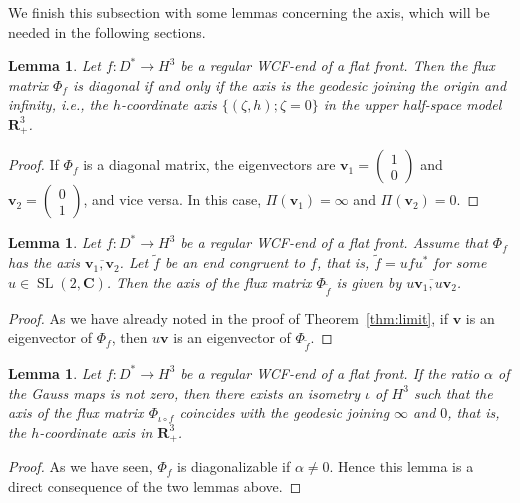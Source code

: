 \documentclass[a4paper]{amsart}
\theoremstyle{plain}
\newtheorem{lemma}[theorem]{Lemma}
\theoremstyle{remark}
\numberwithin{equation}{section}
\begin{document}
We finish this subsection with some lemmas concerning the axis, 
which will be needed in the following sections.
\begin{lemma}\label{lem:flux-diagonal}
 Let $f \colon D^*\to H^3$ be a regular WCF-end of a flat front.
Then the flux matrix
$\Phi_f$ is diagonal if and only if the axis is the geodesic joining 
 the origin and infinity, 
 i.e., the $h$-coordinate 
axis $\{(\zeta,h) ; \zeta=0 \}$ in the upper half-space 
model ${\boldsymbol{R}}^3_+$.
\end{lemma}
\begin{proof}
 If $\Phi_f$ is a diagonal matrix, the eigenvectors are 
 ${\boldsymbol{{v}}}_1=\begin{pmatrix}1\\0\end{pmatrix}$ and
 ${\boldsymbol{{v}}}_2=\begin{pmatrix}0\\1\end{pmatrix}$, 
 and vice versa. 
 In this case, 
 $\Pi({\boldsymbol{{v}}}_1)=\infty$ and $\Pi({\boldsymbol{{v}}}_2)=0$. 
\end{proof}
\begin{lemma}
 Let $f \colon D^*\to H^3$ be a regular WCF-end of a flat front.
 Assume that $\Phi_f$ has the axis $\overline{{\boldsymbol{{v}}}_1,{\boldsymbol{{v}}}_2}$. 
 Let $\tilde f$ be an end congruent to $f$, that is,  
 $\tilde f = ufu^{*}$ for some $u \in {\operatorname{SL}}(2, {\boldsymbol{C}})$.  
 Then the axis of the flux matrix $\Phi_{\tilde f}$ is given by 
 $\overline{u{\boldsymbol{{v}}}_1,u{\boldsymbol{{v}}}_2}$.
\end{lemma}
\begin{proof}
 As we have already noted in the proof of Theorem~\ref{thm:limit}, 
 if ${\boldsymbol{{v}}}$ is an eigenvector of $\Phi_f$, 
 then $u{\boldsymbol{{v}}}$ is an eigenvector of $\Phi_{\tilde f}$. 
\end{proof}

\begin{lemma}\label{lem:vertical-axis}
 Let $f\colon D^*\to H^3$ be a regular WCF-end of a flat front.
 If the ratio $\alpha$ of the Gauss maps is not zero, 
 then there exists an isometry $\iota$ of $H^3$ such that 
 the axis of the flux matrix $\Phi_{\iota \circ f}$ coincides with 
 the  geodesic joining $\infty$ and $0$, that is, the
 $h$-coordinate axis in ${\boldsymbol{R}}^3_+$.
\end{lemma}
\begin{proof}
 As we have seen, $\Phi_f$ is diagonalizable if $\alpha \ne 0$. 
 Hence this lemma is a direct consequence of the two lemmas above. 
\end{proof}
\end{document}
